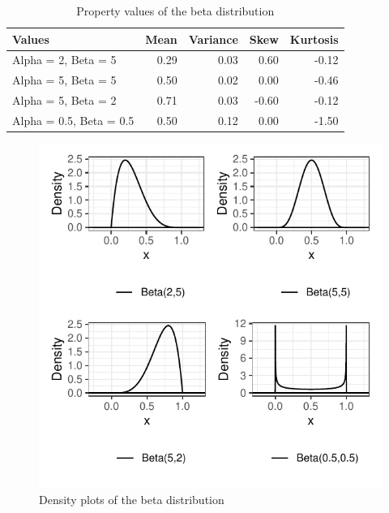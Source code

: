 \documentclass{article}\usepackage[]{graphicx}\usepackage[]{xcolor}
\begin{document}
\begin{multicols}{2}
\begin{table}[H]
\centering
\begingroup\small
\begin{tabular}{lrrrr}
  \hline
Values & Mean & Variance & Skew & Kurtosis \\ 
  \hline
Alpha = 2, Beta = 5 & 0.29 & 0.03 & 0.60 & -0.12 \\ 
  Alpha = 5, Beta = 5 & 0.50 & 0.02 & 0.00 & -0.46 \\ 
  Alpha = 5, Beta = 2 & 0.71 & 0.03 & -0.60 & -0.12 \\ 
  Alpha = 0.5, Beta = 0.5 & 0.50 & 0.12 & 0.00 & -1.50 \\ 
   \hline
\end{tabular}
\endgroup
\caption{Property values of the beta distribution} 
\label{distrib.tab}
\end{table}



\begin{figure}[H]
 \begin{center}
 \includegraphics[scale=0.75]{parameter_comparison.pdf}
 \caption{Density plots of the beta distribution}
 \label{fig1}
 \end{center}
 \end{figure}





\end{multicols}
\end{document}
